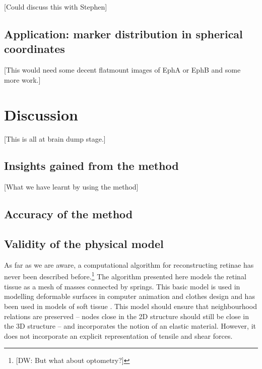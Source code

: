\documentclass[10pt]{article}
\newcommand{\todo}[1]{{\color{red}[#1]}}
\begin{document}
\todo{Could discuss this with Stephen}

\subsection*{Application: marker distribution in spherical coordinates}

\todo{This would need some decent flatmount images of EphA or EphB
  and some more work.}

\section*{Discussion}

\todo{This is all at brain dump stage.}

\subsection*{Insights gained from the method}

\todo{What we have learnt by using the method}

\subsection*{Accuracy of the method}

\subsection*{Validity of the physical model}

As far as we are aware, a computational algorithm for reconstructing
retinae has never been described
before.\footnote{\todo{DW: But what about optometry?}} The algorithm
presented here models the retinal tissue as a mesh of masses connected
by springs. This basic model is used in modelling deformable surfaces
in computer animation and clothes design
\cite{FanEtal98spri,MaCaEtal99flat,WangEtal02surf} and has been used
in models of soft tissue \cite{SkriDunc99real}.  This model should
ensure that neighbourhood relations are preserved -- nodes close in
the 2D structure should still be close in the 3D structure -- and
incorporates the notion of an elastic material. However, it does not
incorporate an explicit representation of tensile and shear forces.
\end{document}
